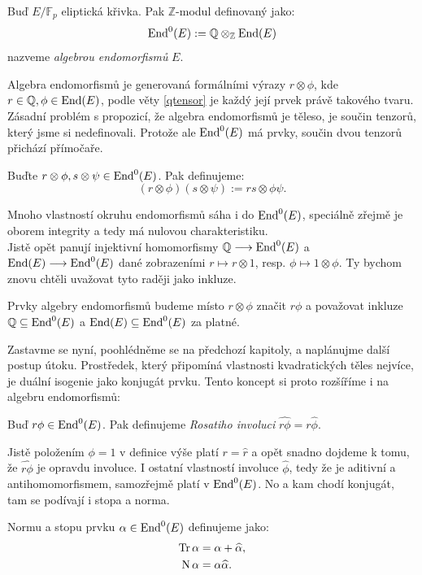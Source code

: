 \documentclass[12pt]{report}
\begin{document}
\begin{definice}
Buď $E/\mathbb{F}_p$ eliptická křivka. Pak $\mathbb{Z}$-modul definovaný jako:
\begin{equation*}
\operatorname{End}^0 (E) := \mathbb{Q} \otimes_{\mathbb{Z}} \operatorname{End}(E)
\end{equation*}
nazveme \textit{algebrou endomorfismů} $E$.
\end{definice}

Algebra endomorfismů je generovaná formálními výrazy $r \otimes \phi$, kde $r \in \mathbb{Q}, \phi \in \operatorname{End}(E)$, podle věty \ref{qtensor} je každý její prvek právě takového tvaru. Zásadní problém s propozicí, že algebra endomorfismů je těleso, je součin tenzorů, který jsme si nedefinovali. Protože ale $\operatorname{End}^0 (E)$ má  prvky, součin dvou tenzorů přichází přímočaře.
\begin{definice}
Buďte $r \otimes \phi, s \otimes \psi \in \operatorname{End}^0(E)$. Pak definujeme:
\begin{equation*}
(r \otimes \phi) (s \otimes \psi) := rs \otimes \phi \psi.
\end{equation*} 
\end{definice}

Mnoho vlastností okruhu endomorfismů sáha i do $\operatorname{End}^0 (E)$, speciálně zřejmě je oborem integrity a tedy má nulovou charakteristiku.\\

Jistě opět panují injektivní homomorfismy $\mathbb{Q} \longrightarrow \operatorname{End}^0 (E)$ a $\operatorname{End}(E) \longrightarrow \operatorname{End}^0 (E)$ dané zobrazeními $r \mapsto r \otimes 1$, resp. $\phi \mapsto 1 \otimes \phi$. Ty bychom znovu chtěli uvažovat tyto raději jako inkluze.

\begin{umluva}
Prvky algebry endomorfismů budeme místo $r \otimes \phi$ značit $r \phi$ a považovat inkluze $\mathbb{Q} \subseteq \operatorname{End}^0 (E)$ a $\operatorname{End}(E) \subseteq \operatorname{End}^0 (E)$ za platné.
\end{umluva}

Zastavme se nyní, poohlédněme se na předchozí kapitoly, a naplánujme další postup útoku. Prostředek, který připomíná vlastnosti kvadratických těles nejvíce, je duální isogenie jako konjugát prvku. Tento koncept si proto rozšíříme i na algebru endomorfismů:
\begin{definice}
Buď $r \phi \in \operatorname{End}^0 (E)$. Pak definujeme \textit{Rosatiho involuci} $\widehat{r \phi} = r \widehat{\phi}$.
\end{definice}
Jistě položením $\phi = 1$ v definice výše platí $r = \widehat{r}$ a opět snadno dojdeme k tomu, že $\widehat{r \phi}$ je opravdu involuce. I ostatní vlastností involuce $\widehat{\phi}$, tedy že je aditivní a antihomomorfismem, samozřejmě platí v $\operatorname{End}^0 (E)$. No a kam chodí konjugát, tam se podívají i stopa a norma.
\begin{definice}
Normu a stopu prvku $\alpha \in \operatorname{End}^0(E)$ definujeme jako:
\begin{align*}
\operatorname{Tr} \alpha &= \alpha+\widehat{\alpha},\\
\operatorname{N} \alpha &= \alpha \widehat{\alpha}. 
\end{align*}
\end{definice}
\end{document}
